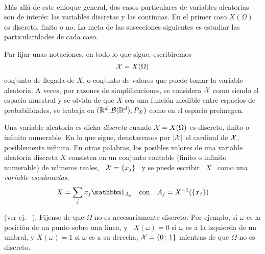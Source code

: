 \

M\'as  all\'a de  este  enfoque  general, dos  casos  particulares de  variables
aleatorias son  de inter\'es:  las variables discretas  y las continuas.   En el
primer caso  $X(\Omega)$ es discreto, finito  o no.  La meta  de las susecciones
siguientes es estudiar las particularidades de cada caso.

Par fijar unas notaciones, en todo lo que sigue, escribiremos
%
\[
\mathcal{X} = X(\Omega)
\]
%
conjunto de  llegada de $X$, o conjunto  de valores que puede  tomar la variable
aleatoria.  A  veces, por  razones de simplificaciones,  se considera  $\mathcal{X}$ como
siendo el  espacio muestral  y se olvida  de que  $X$ sea una  funci\'on medible
entre espacios de probabilidades,  \ie se trabaja en $(\mathbb{R}^d,\mathcal{B}(\mathbb{R}^d),P_X)$
como en el espacio preimagen.




\label{sec:MP:VADiscreta}

\begin{definicion}
  Una  variable aleatoria es  dicha {\it  discreta} cuando  $\mathcal{X} =  X(\Omega)$ es
  discreto,  finito o  infinito numerable.   En  lo que  sigue, denotaremos  por
  $|\mathcal{X}|$  el cardinal  de $\mathcal{X}$,  posiblemente infinito.  En otras  palabras, los
  posibles  valores de  una  variable  aleatoria discreta  $X$  consisten en  un
  conjunto contable (finito  o infinito numerable) de n\'umeros  reales, \ $\mathcal{X} =
  \{ x_j \}$ \ y se puede escribir \ $X$ \ como una {\it variable escalonadas},
  \[
  X = \sum_j x_j \un_{A_j} \quad \mbox{con} \quad A_j = X^{-1}(\{ x_j \})
  \]
\end{definicion}
%
\noindent (ver ej.  ~\cite{AthLah06, HogMck13}).  Fijense de que  $\Omega$ no es
necesariamente discreto.  Por ejemplo, si  $\omega$ es la posici\'on de un punto
sobre una linea, y \ $X(\omega) = 0$ si $\omega$ es a la izquierda de un umbral, y
$X(\omega) = 1$ si $\omega$  es a su derecha, $\mathcal{X} = \{ 0 \,  ; \, 1 \}$ mientras
de que $\Omega$ no es discreto.

